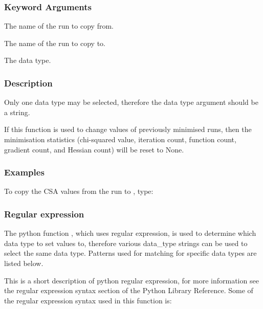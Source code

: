 \subsubsection{Keyword Arguments}

  The name of the run to copy from. 

  The name of the run to copy to. 

  The data type. 




\subsubsection{Description}

Only one data type may be selected, therefore the data type argument should be a string.


If this function is used to change values of previously minimised runs, then the minimisation statistics (chi-squared value, iteration count, function count, gradient count, and Hessian count) will be reset to None.



\subsubsection{Examples}

To copy the CSA values from the run  to , type:




\subsubsection{Regular expression}

The python function , which uses regular expression, is used to determine which data type to set values to, therefore various data\_type strings can be used to select the same data type.  Patterns used for matching for specific data types are listed below.


This is a short description of python regular expression, for more information see the regular expression syntax section of the Python Library Reference.  Some of the regular expression syntax used in this function is:


